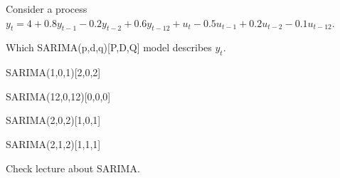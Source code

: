 
\begin{question}
Consider a process \(y_t = 4 + 0.8 y_{t-1} - 0.2 y_{t-2} + 0.6 y_{t-12} + u_t - 0.5 u_{t-1} + 0.2 u_{t-2} - 0.1 u_{t-12}\).

Which SARIMA(p,d,q){[}P,D,Q{]} model describes \(y_t\).
\begin{answerlist}
  \item SARIMA(1,0,1){[}2,0,2{]}
  \item SARIMA(12,0,12){[}0,0,0{]}
  \item SARIMA(2,0,2){[}1,0,1{]}
  \item SARIMA(2,1,2){[}1,1,1{]}
\end{answerlist}
\end{question}

\begin{solution}
Check lecture about SARIMA.
\end{solution}

